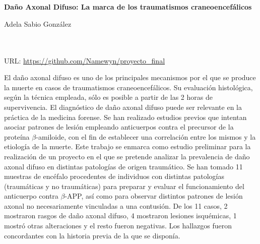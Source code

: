 \chapter*{}


%



\cleardoublepage
\thispagestyle{empty}

\begin{center}
{\large\bfseries Daño Axonal Difuso: La marca de los traumatismos craneoencefálicos}\\
\end{center}
\begin{center}
Adela Sabio González \\
\end{center}

\\

\vspace{0.7cm}
\\

URL: \url{https://github.com/Namewyn/proyecto_final}


El daño axonal difuso es uno de los principales mecanismos por el que se produce la muerte en casos de traumatismos craneoencefálicos. Su evaluación histológica, según la técnica empleada, sólo es posible a partir de las 2 horas de supervivencia. El diagnóstico de daño axonal difuso puede ser relevante en la práctica de la medicina forense. Se han realizado estudios previos que intentan asociar patrones de lesión empleando anticuerpos contra el precursor de la proteína $\beta$-amiloide, con el fin de establecer una correlación entre los mismos y la etiología de la muerte. Este trabajo se enmarca como estudio preliminar para la realización de un proyecto en el que se pretende analizar la prevalencia de daño axonal difuso en distintas patologías de origen traumático. Se han tomado 11 muestras de encéfalo procedentes de individuos con distintas patologías (traumáticas y no traumáticas) para preparar y evaluar el funcionamiento del anticuerpo contra $\beta$-APP, así como para observar distintos patrones de lesión axonal no necesariamente vinculadas a una contusión. De los 11 casos, 2 mostraron rasgos de daño axonal difuso, 4 mostraron lesiones isquémicas, 1 mostró otras alteraciones y el resto fueron negativas. Los hallazgos fueron concordantes con la historia previa de la que se disponía. 
\cleardoublepage


